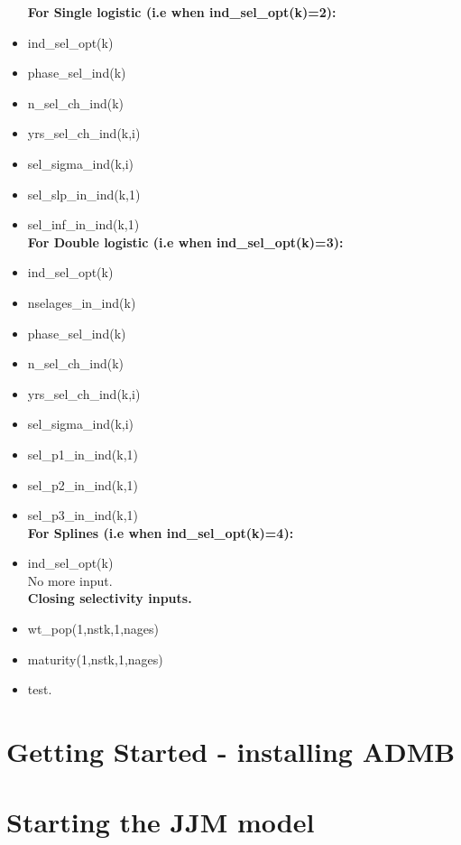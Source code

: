 \documentclass{article}
\begin{document}
\begin{itemize}
    \textbf{For Single logistic 
 (i.e when ind\_sel\_opt(k)=2):}\\
    \item ind\_sel\_opt(k)
    \item phase\_sel\_ind(k)
    \item n\_sel\_ch\_ind(k)
    \item yrs\_sel\_ch\_ind(k,i)
    \item sel\_sigma\_ind(k,i)
    \item sel\_slp\_in\_ind(k,1)
    \item sel\_inf\_in\_ind(k,1)\\
    
    \textbf{For Double logistic 
 (i.e when ind\_sel\_opt(k)=3):}\\
    \item ind\_sel\_opt(k)
    \item nselages\_in\_ind(k)
    \item phase\_sel\_ind(k)
    \item n\_sel\_ch\_ind(k)
    \item yrs\_sel\_ch\_ind(k,i)
    \item sel\_sigma\_ind(k,i)
    \item sel\_p1\_in\_ind(k,1)
    \item sel\_p2\_in\_ind(k,1)
    \item sel\_p3\_in\_ind(k,1)\\
    
     \textbf{For Splines (i.e when ind\_sel\_opt(k)=4):}\\
    \item ind\_sel\_opt(k)\\
    
    No more input.\\

    \textbf{Closing selectivity inputs.}
    \item wt\_pop(1,nstk,1,nages)
    \item maturity(1,nstk,1,nages)
    \item test.
    
 


    
\end{itemize}
\section{Getting Started - installing ADMB}
\section{Starting the JJM model}
\end{document}
